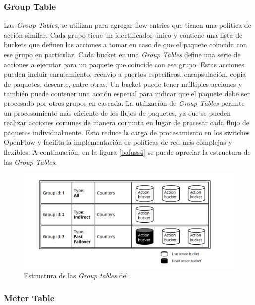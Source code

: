 \subsubsection{Group Table}

Las \textit{Group Tables}, se utilizan para agregar flow entries que tienen una politica de acción similar. Cada grupo tiene un identificador único y contiene una lista de buckets que definen las acciones a tomar en caso de que el paquete coincida con ese grupo en particular. Cada bucket en una \textit{Group Tables} define una serie de acciones a ejecutar para un paquete que coincide con ese grupo. Estas acciones pueden incluir enrutamiento, reenvío a puertos específicos, encapsulación, copia de paquetes, descarte, entre otras. Un bucket puede tener múltiples acciones y también puede contener una acción especial para indicar que el paquete debe ser procesado por otros grupos en cascada. La utilización de \textit{Group Tables} permite un procesamiento más eficiente de los flujos de paquetes, ya que se pueden realizar acciones comunes de manera conjunta en lugar de procesar cada flujo de paquetes individualmente. Esto reduce la carga de procesamiento en los switches OpenFlow y facilita la implementación de políticas de red más complejas y flexibles. A continuación, en la figura \ref{bofuss4} se puede apreciar la estructura de las \textit{Group Tables}.

\begin{figure}[ht]
    \centering
    \includegraphics[width=\textwidth]{archivos/img/teoria/bofuss4.png}
    \caption{Estructura de las \textit{Group tables} del }
    \label{fig:bofuss4}
\end{figure}


\subsubsection{Meter Table}

